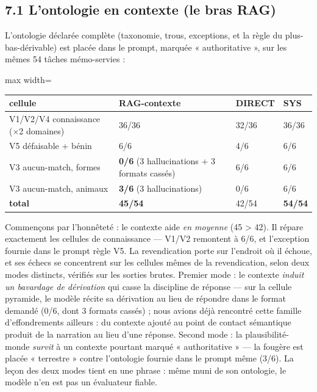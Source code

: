 \documentclass[11pt]{article}
\begin{document}
\subsection*{7.1 L'ontologie en contexte (le bras RAG)}

L'ontologie déclarée complète (taxonomie, trous, exceptions, et la règle du plus-bas-dérivable) est placée dans le prompt, marquée « authoritative », sur les mêmes 54 tâches mémo-servies :

\begin{center}\small\begin{adjustbox}{max width=\linewidth}\begin{tabular}{llll}\toprule
cellule & RAG-contexte & DIRECT & SYS \\ \midrule
V1/V2/V4 connaissance (×2 domaines) & 36/36 & 32/36 & 36/36 \\
V5 défaisable + bénin & 6/6 & 4/6 & 6/6 \\
V3 aucun-match, formes & \textbf{0/6} (3 hallucinations + 3 formats cassés) & 6/6 & 6/6 \\
V3 aucun-match, animaux & \textbf{3/6} (3 hallucinations) & 0/6 & 6/6 \\
\textbf{total} & \textbf{45/54} & 42/54 & \textbf{54/54} \\
\bottomrule\end{tabular}\end{adjustbox}\end{center}

Commençons par l'honnêteté : le contexte aide \emph{en moyenne} (45 > 42). Il répare exactement les cellules de connaissance — V1/V2 remontent à 6/6, et l'exception fournie dans le prompt règle V5. La revendication porte sur l'endroit où il échoue, et ses échecs se concentrent sur les cellules mêmes de la revendication, selon deux modes distincts, vérifiés sur les sorties brutes. Premier mode : le contexte \emph{induit un bavardage de dérivation} qui casse la discipline de réponse — sur la cellule pyramide, le modèle récite sa dérivation au lieu de répondre dans le format demandé (0/6, dont 3 formats cassés) ; nous avions déjà rencontré cette famille d'effondrements ailleurs : du contexte ajouté au point de contact sémantique produit de la narration au lieu d'une réponse. Second mode : la plausibilité-monde \emph{survit} à un contexte pourtant marqué « authoritative » — la fougère est placée « terrestre » contre l'ontologie fournie dans le prompt même (3/6). La leçon des deux modes tient en une phrase : même muni de son ontologie, le modèle n'en est pas un évaluateur fiable.
\end{document}
